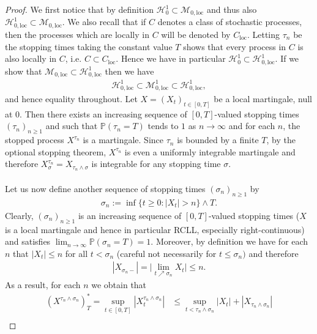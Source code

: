 \documentclass[12pt,a4paper, twoside]{article}
\theoremstyle{definition}
\newcommand{\PP}{\mathbb{P}} %
\begin{document}
\begin{proof}
We first notice that by definition $\mathcal{H}_0^1 \subset \mathcal{M}_{0, \text{loc}}$ and thus also $\mathcal{H}_{0, \text{loc}}^1 \subset \mathcal{M}_{0, \text{loc}}$. We also recall that if $C$ denotes a class of stochastic processes, then the processes which are locally in $C$ will be denoted by $C_\text{loc}$. Letting $\tau_n$ be the stopping times taking the constant value $T$ shows that every process in $C$ is also locally in $C$, i.e. $C \subset C_\text{loc}$. Hence we have in particular $\mathcal{H}_0^1 \subset \mathcal{H}_{0,\text{loc}}^1$. If we show that $\mathcal{M}_{0, \text{loc}} \subset \mathcal{H}_{0, \text{loc}}^1$ then we have
\begin{align*}
\mathcal{H}_{0, \text{loc}}^1 \subset \mathcal{M}_{0, \text{loc}}^1 \subset \mathcal{H}_{0, \text{loc}}^1,
\end{align*}
and hence equality throughout. 
\newpage
Let $X=(X_t)_{t \in [0,T]}$ be a local martingale, null at $0$. Then there exists an increasing sequence of $[0,T]$-valued stopping times $(\tau_n)_{n \geq 1}$ and such that $\PP( \tau_n=T)$ tends to $1$ as $n \to \infty$ and for each $n$, the stopped process $X^{\tau_n}$ is a martingale. Since $\tau_n$ is bounded by a finite $T$, by the optional stopping theorem, $X^{\tau_n}$ is even a uniformly integrable martingale and therefore $X_\sigma^{\tau_n}= X_{\tau_n \wedge \sigma}$ is integrable for any stopping time $\sigma$. 
\\\\
Let us now define another sequence of stopping times $( \sigma_n)_{n \geq 1}$ by
\begin{align*}
\sigma_n:= \inf \{ t \geq 0 : |X_t| > n \} \wedge T.
\end{align*}
Clearly, $( \sigma_n)_{n \geq 1}$ is an increasing sequence of $[0,T]$-valued stopping times ($X$ is a local martingale and hence in particular RCLL, especially right-continuous) and satisfies $\lim_{n \to \infty} \PP( \sigma_n=T)=1$. Moreover, by definition we have for each $n$ that $|X_t| \leq n$ for all $t < \sigma_n$ (careful not necessarily for $t \leq \sigma_n)$ and therefore
\begin{align*}
| X_{\sigma_n-}| = \Big| \lim_{t \nearrow \sigma_n} X_t\Big| \leq n.
\end{align*}
As a result, for each $n$ we obtain that 
\begin{align*}
(X^{\tau_n \wedge \sigma_n})_T^*= \sup_{t \in [0,T]} |X_t^{ \tau_n \wedge \sigma_n}| &\leq \sup_{t < \tau_n \wedge \sigma_n} |X_t| + |X_{ \tau_n \wedge \sigma_n}| \\

\end{align*}
\end{proof}
\end{document}
